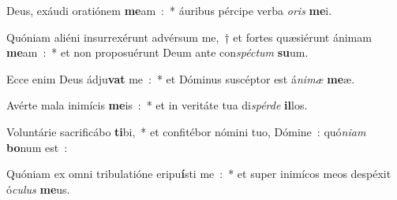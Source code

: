 ﻿\item Deus, exáudi oratiónem \textbf{me}am~:~* áuribus pércipe verba \emph{o}\emph{ris} \textbf{me}i.
\item Quóniam aliéni insurrexérunt advérsum me,~† et fortes quæsiérunt ánimam \textbf{me}am~:~* et non proposuérunt Deum ante con\emph{spé}\emph{ctum} \textbf{su}um.
\item Ecce enim Deus ádju\textbf{vat} me~:~* et Dóminus suscéptor est á\emph{ni}\emph{mæ} \textbf{me}æ.
\item Avérte mala inimícis \textbf{me}is~:~* et in veritáte tua di\emph{spér}\emph{de} \textbf{il}los.
\item Voluntárie sacrificábo \textbf{ti}bi,~* et confitébor nómini tuo, Dómine~: quó\emph{ni}\emph{am} \textbf{bo}num est~:
\item Quóniam ex omni tribulatióne eripu\textbf{í}sti me~:~* et super inimícos meos despéxit ó\emph{cu}\emph{lus} \textbf{me}us.